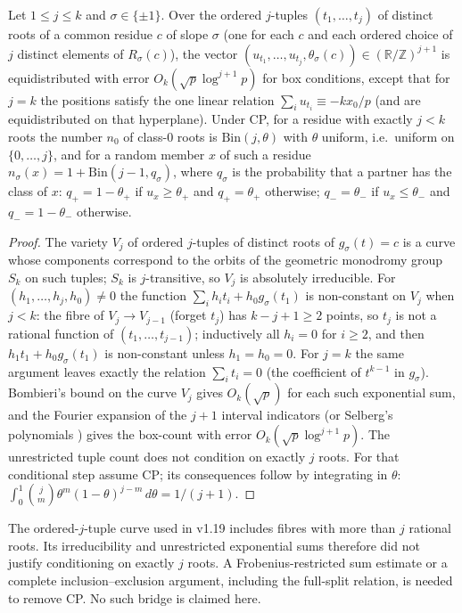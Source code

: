 \begin{lemma}\label{lem:positions}
Let $1\le j\le k$ and $\sigma\in\{\pm1\}$.  Over the ordered $j$-tuples $(t_1,\dots,t_j)$ of distinct roots of a common residue $c$ of slope $\sigma$ (one for each $c$
and each ordered choice of $j$ distinct elements of $R_\sigma(c)$), the vector $(u_{t_1},\dots,u_{t_j},\theta_\sigma(c))\in(\mathbb R/\mathbb Z)^{j+1}$ is equidistributed
with error $O_k(\sqrt p\log^{j+1}p)$ for box conditions, except that for $j=k$ the positions satisfy the one linear relation $\sum_iu_{t_i}\equiv-kx_0/p$
(and are equidistributed on that hyperplane).  Under CP, for a residue with exactly $j<k$ roots the number $n_0$ of class-$0$ roots is $\mathrm{Bin}(j,\theta)$
with $\theta$ uniform, i.e.\ uniform on $\{0,\dots,j\}$, and for a random member $x$ of such a residue $n_\sigma(x)=1+\mathrm{Bin}(j-1,q_\sigma)$, where
$q_\sigma$ is the probability that a partner has the class of $x$: $q_+=1-\theta_+$ if $u_x\ge\theta_+$ and $q_+=\theta_+$ otherwise;
$q_-=\theta_-$ if $u_x\le\theta_-$ and $q_-=1-\theta_-$ otherwise.
\end{lemma}
\begin{proof}
The variety $V_j$ of ordered $j$-tuples of distinct roots of $g_\sigma(t)=c$ is a curve whose components correspond to the orbits of the geometric monodromy
group $S_k$ on such tuples; $S_k$ is $j$-transitive, so $V_j$ is absolutely irreducible.  For $(h_1,\dots,h_j,h_0)\ne0$ the function
$\sum_ih_it_i+h_0g_\sigma(t_1)$ is non-constant on $V_j$ when $j<k$: the fibre of $V_j\to V_{j-1}$ (forget $t_j$) has $k-j+1\ge2$ points, so $t_j$ is not a
rational function of $(t_1,\dots,t_{j-1})$; inductively all $h_i=0$ for $i\ge2$, and then $h_1t_1+h_0g_\sigma(t_1)$ is non-constant unless $h_1=h_0=0$.  For
$j=k$ the same argument leaves exactly the relation $\sum_it_i=0$ (the coefficient of $t^{k-1}$ in $g_\sigma$).  Bombieri's bound on the curve $V_j$
\cite{IK} gives $O_k(\sqrt p)$ for each such exponential sum, and the Fourier expansion of the $j+1$ interval indicators (or Selberg's polynomials
\cite{Montgomery,Vaaler}) gives the box-count with error $O_k(\sqrt p\log^{j+1}p)$.  The unrestricted tuple count does not condition on exactly $j$ roots.  For that conditional step assume CP; its consequences follow by integrating in $\theta$:
$\int_0^1\binom j m\theta^m(1-\theta)^{j-m}\,d\theta=1/(j+1)$.
\end{proof}

The ordered-$j$-tuple curve used in v1.19 includes fibres with more than $j$ rational roots.
Its irreducibility and unrestricted exponential sums therefore did not justify conditioning on exactly $j$ roots.
A Frobenius-restricted sum estimate or a complete inclusion--exclusion argument, including the full-split relation, is needed to remove CP.
No such bridge is claimed here.

